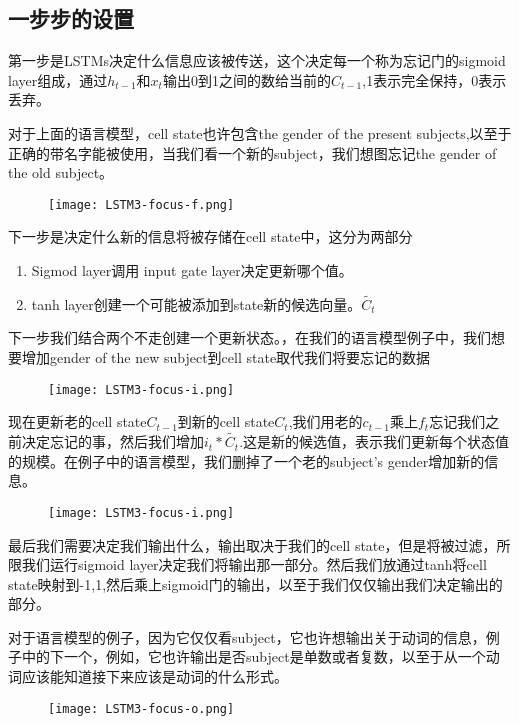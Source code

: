 \subsection{一步步的设置}
第一步是LSTMs决定什么信息应该被传送，这个决定每一个称为忘记门的sigmoid layer组成，通过$h_{t-1}$和$x_t$输出0到1之间的数给当前的$C_{t-1}$,1表示完全保持，0表示丢弃。\par
对于上面的语言模型，cell state也许包含the gender of the present subjects,以至于正确的带名字能被使用，当我们看一个新的subject，我们想图忘记the gender of the old subject。
\begin{figure}
\centering
\texttt{[image: LSTM3-focus-f.png]}
\end{figure}
下一步是决定什么新的信息将被存储在cell state中，这分为两部分
\begin{enumerate}
	\item Sigmod layer调用 input gate layer决定更新哪个值。
	\item tanh layer创建一个可能被添加到state新的候选向量。$\widetilde{C_t}$
\end{enumerate}
下一步我们结合两个不走创建一个更新状态。，在我们的语言模型例子中，我们想要增加gender of the new subject到cell state取代我们将要忘记的数据
\begin{figure}
\centering
\texttt{[image: LSTM3-focus-i.png]}
\end{figure}
现在更新老的cell state$C_{t-1}$到新的cell state$C_t$,我们用老的$c_{t-1}$乘上$f_t$忘记我们之前决定忘记的事，然后我们增加$i_t*\widetilde{C_t}$.这是新的候选值，表示我们更新每个状态值的规模。在例子中的语言模型，我们删掉了一个老的subject's gender增加新的信息。
\begin{figure}
\centering
\texttt{[image: LSTM3-focus-i.png]}
\end{figure}
最后我们需要决定我们输出什么，输出取决于我们的cell state，但是将被过滤，所限我们运行sigmoid layer决定我们将输出那一部分。然后我们放通过tanh将cell state映射到-1,1,然后乘上sigmoid门的输出，以至于我们仅仅输出我们决定输出的部分。\par
对于语言模型的例子，因为它仅仅看subject，它也许想输出关于动词的信息，例子中的下一个，例如，它也许输出是否subject是单数或者复数，以至于从一个动词应该能知道接下来应该是动词的什么形式。
\begin{figure}
\centering
\texttt{[image: LSTM3-focus-o.png]}
\end{figure}
